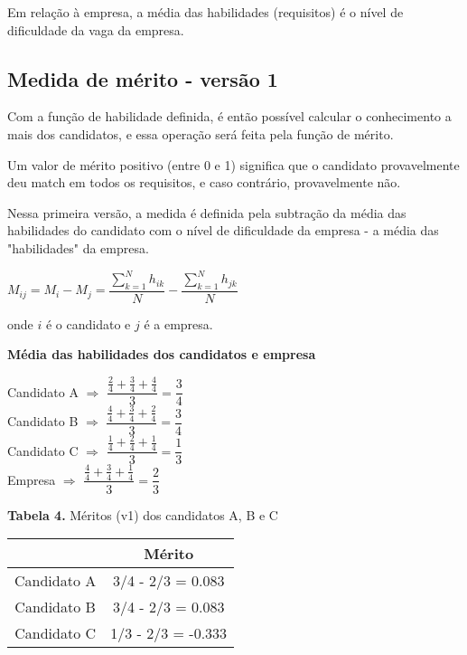 \documentclass[]{article}
\begin{document}
	Em relação à empresa, a média das habilidades (requisitos) é o nível de dificuldade da vaga da empresa.
		
	\subsection{Medida de mérito - versão 1}
	Com a função de habilidade definida, é então possível calcular o conhecimento a mais dos candidatos, e essa operação será feita pela função de mérito.
	
	Um valor de mérito positivo (entre 0 e 1) significa que o candidato provavelmente deu match em todos os requisitos, e caso contrário, provavelmente não.
	
	Nessa primeira versão, a medida é definida pela subtração da média das habilidades do candidato com o nível de dificuldade da empresa - a média das "habilidades" da empresa.
	
	\begin{center}
	$ M_{ij} = M_i - M_j = \dfrac{\sum_{k = 1}^N h_{ik}}{N} - \dfrac{\sum_{k = 1}^N h_{jk}}{N}$
	\end{center}

    \noindent onde $i$ é o candidato e $j$ é a empresa.
	
	\begin{center}
		\noindent \textbf{Média das habilidades dos candidatos e empresa}
		
		Candidato A $\Rightarrow$ $\dfrac{\frac{2}{4} + \frac{3}{4} + \frac{4}{4}}{3} = \dfrac{3}{4}$ \\
	
		Candidato B $\Rightarrow$ $\dfrac{\frac{4}{4} + \frac{3}{4} + \frac{2}{4}}{3} = \dfrac{3}{4}$ \\
	
		Candidato C $\Rightarrow$ $\dfrac{\frac{1}{4} + \frac{2}{4} + \frac{1}{4}}{3} = \dfrac{1}{3}$ \\
		
		Empresa $\Rightarrow$ $\dfrac{\frac{4}{4} + \frac{3}{4} + \frac{1}{4}}{3} = \dfrac{2}{3}$ \\
	\end{center}
	
	
	\begin{center}
		\noindent \textbf{Tabela 4.}
		\noindent Méritos (v1) dos candidatos A, B e C
		
		\begin{tabular}{| c | c |} 
			\hline
			& Mérito \\ [0.5ex] 
			\hline
			Candidato A & 3/4 - 2/3 = 0.083 \\
			\hline
			Candidato B & 3/4 - 2/3 = 0.083  \\
			\hline
			Candidato C & 1/3 - 2/3 = -0.333 \\
			\hline
		\end{tabular}
	\end{center}
\end{document}
